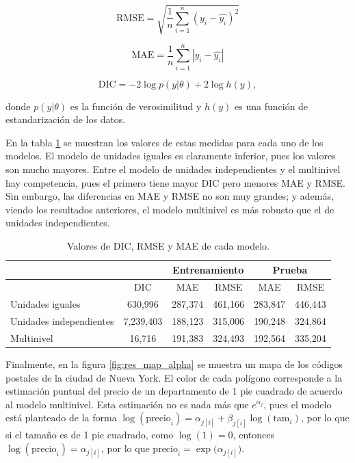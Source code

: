 \[
	\mathrm{RMSE} = \sqrt{ \frac{1}{n} \sum_{i = 1}^n \left( y_i - \hat{y_i} \right)^2 }
\]

\[
	\mathrm{MAE} = \frac{1}{n} \sum_{i = 1}^n \left| y_i - \hat{y_i} \right|
\]

\[
	\mathrm{DIC} = -2 \log{p(y | \theta)} + 2 \log{h(y)},
\]

donde $p(y | \theta)$ es la función de verosimilitud y $h(y)$ es una función de estandarización de los datos.

En la tabla \ref{tab:dic_rmse_mae} se muestran los valores de estas medidas para cada uno de los modelos. El modelo de unidades iguales es claramente inferior, pues los valores son mucho mayores. Entre el modelo de unidades independientes y el multinivel hay competencia, pues el primero tiene mayor DIC pero menores MAE y RMSE. Sin embargo, las diferencias en MAE y RMSE no son muy grandes; y además, viendo los resultados anteriores, el modelo multinivel es más robusto que el de unidades independientes.

\begin{table}[]
	\centering
	\caption{Valores de DIC, RMSE y MAE de cada modelo.}
	\label{tab:dic_rmse_mae}
	\begin{tabular}{|l|c|c|c|c|c|}
	\hline
	                        &           & \multicolumn{2}{c|}{Entrenamiento} & \multicolumn{2}{c|}{Prueba} \\ \hline
	                        & DIC       & MAE              & RMSE            & MAE          & RMSE         \\ \hline
	Unidades iguales        & 630,996   & 287,374          & 461,166         & 283,847      & 446,443      \\ \hline
	Unidades independientes & 7,239,403 & 188,123          & 315,006         & 190,248      & 324,864      \\ \hline
	Multinivel              & 16,716    & 191,383          & 324,493         & 192,564      & 335,204      \\ \hline
	\end{tabular}
\end{table}


Finalmente, en la figura \ref{fig:res_map_alpha} se muestra un mapa de los códigos postales de la ciudad de Nueva York. El color de cada polígono corresponde a la estimación puntual del precio de un departamento de 1 pie cuadrado de acuerdo al modelo multinivel. Esta estimación no es nada más que $e^{\alpha_j}$, pues el modelo está planteado de la forma $\log{(\mathrm{precio}_i)} = \alpha_{j[i]} + \beta_{j[i]} \log{(\mathrm{tam}_i)}$, por lo que si el tamaño es de 1 pie cuadrado, como $\log(1) = 0$, entonces $\log{(\mathrm{precio}_i)} = \alpha_{j[i]}$, por lo que $\mathrm{precio}_i = \exp{(\alpha_{j[i]}})$.

